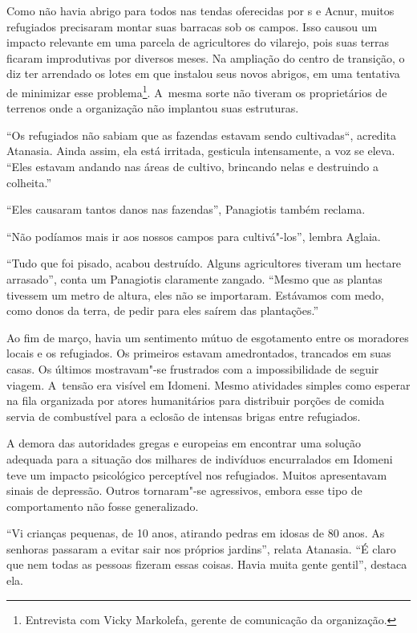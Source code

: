 Como não havia abrigo para todos nas tendas oferecidas por s e Acnur,
muitos refugiados precisaram montar suas barracas sob os campos. Isso
causou um impacto relevante em uma parcela de agricultores do vilarejo,
pois suas terras ficaram improdutivas por diversos meses. Na ampliação
do centro de transição, o  diz ter arrendado os lotes em que instalou
seus novos abrigos, em uma tentativa de minimizar esse
problema\footnote{ Entrevista com Vicky Markolefa, gerente de
comunicação da organização.}. A~mesma sorte não tiveram os
proprietários de terrenos onde a organização não implantou suas
estruturas.

``Os refugiados não sabiam que as fazendas estavam sendo cultivadas``,
acredita Atanasia. Ainda assim, ela está irritada, gesticula
intensamente, a voz se eleva. ``Eles estavam andando nas áreas de
cultivo, brincando nelas e destruindo a colheita.''

``Eles causaram tantos danos nas fazendas'', Panagiotis também reclama.

``Não podíamos mais ir aos nossos campos para cultivá"-los'', lembra
Aglaia.

``Tudo que foi pisado, acabou destruído. Alguns agricultores tiveram um
hectare arrasado'', conta um Panagiotis claramente zangado. ``Mesmo que
as plantas tivessem um metro de altura, eles não se importaram.
Estávamos com medo, como donos da terra, de pedir para eles saírem das
plantações.''

Ao fim de março, havia um sentimento mútuo de esgotamento entre os
moradores locais e os refugiados. Os primeiros estavam amedrontados,
trancados em suas casas. Os últimos mostravam"-se frustrados com a
impossibilidade de seguir viagem. A~tensão era visível em Idomeni. Mesmo
atividades simples como esperar na fila organizada por atores
humanitários para distribuir porções de comida servia de combustível
para a eclosão de intensas brigas entre refugiados.

A demora das autoridades gregas e europeias em encontrar uma solução
adequada para a situação dos milhares de indivíduos encurralados em
Idomeni teve um impacto psicológico perceptível nos refugiados. Muitos
apresentavam sinais de depressão. Outros tornaram"-se agressivos, embora
esse tipo de comportamento não fosse generalizado.

``Vi crianças pequenas, de 10 anos, atirando pedras em idosas de 80
anos. As senhoras passaram a evitar sair nos próprios jardins'', relata
Atanasia. ``É claro que nem todas as pessoas fizeram essas coisas. Havia
muita gente gentil'', destaca ela.

